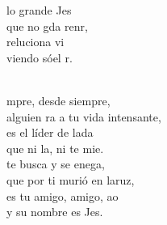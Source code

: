 \begin{cancion}
\jump
	 lo grande Jes  \\
	 que no gda renr,\\
	reluciona  vi\\
	viendo sóel r.\\\jump\\
	\begin{chorus}%
	mpre, desde siempre,\\
	alguien ra a tu vida intensante,\\
	es el líder de lada\\
	que ni la, ni te mie.\\
\jump
	 te busca y se enega,\\
	que por ti murió en laruz,\\
	es tu amigo, amigo, ao\\
	y su nombre es Jes.\\
	\end{chorus}%
	\jump\\
	       \\
\end{cancion}%
